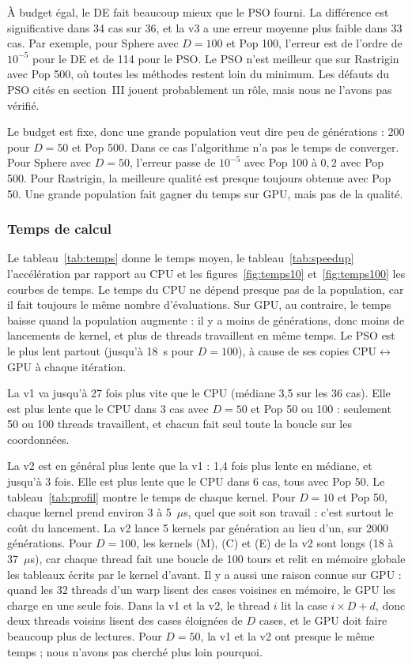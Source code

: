 \documentclass[conference]{IEEEtran}
\begin{document}
\`A budget \'egal, le DE fait beaucoup mieux que le PSO fourni. La diff\'erence est significative dans 34 cas sur 36, et la v3 a une erreur moyenne plus faible dans 33 cas. Par exemple, pour Sphere avec $D=100$ et Pop 100, l'erreur est de l'ordre de $10^{-5}$ pour le DE et de 114 pour le PSO. Le PSO n'est meilleur que sur Rastrigin avec Pop 500, o\`u toutes les m\'ethodes restent loin du minimum. Les d\'efauts du PSO cit\'es en section~III jouent probablement un r\^ole, mais nous ne l'avons pas v\'erifi\'e.

Le budget est fixe, donc une grande population veut dire peu de g\'en\'erations : 200 pour $D=50$ et Pop 500. Dans ce cas l'algorithme n'a pas le temps de converger. Pour Sphere avec $D=50$, l'erreur passe de $10^{-5}$ avec Pop 100 \`a $0{,}2$ avec Pop 500. Pour Rastrigin, la meilleure qualit\'e est presque toujours obtenue avec Pop 50. Une grande population fait gagner du temps sur GPU, mais pas de la qualit\'e.

\subsubsection{Temps de calcul}
Le tableau~\ref{tab:temps} donne le temps moyen, le tableau~\ref{tab:speedup} l'acc\'el\'eration par rapport au CPU et les figures~\ref{fig:temps10} et~\ref{fig:temps100} les courbes de temps. Le temps du CPU ne d\'epend presque pas de la population, car il fait toujours le m\^eme nombre d'\'evaluations. Sur GPU, au contraire, le temps baisse quand la population augmente : il y a moins de g\'en\'erations, donc moins de lancements de kernel, et plus de threads travaillent en m\^eme temps. Le PSO est le plus lent partout (jusqu'\`a 18~s pour $D=100$), \`a cause de ses copies CPU$\leftrightarrow$GPU \`a chaque it\'eration.

La v1 va jusqu'\`a 27 fois plus vite que le CPU (m\'ediane 3,5 sur les 36 cas). Elle est plus lente que le CPU dans 3 cas avec $D=50$ et Pop 50 ou 100 : seulement 50 ou 100 threads travaillent, et chacun fait seul toute la boucle sur les coordonn\'ees.

La v2 est en g\'en\'eral plus lente que la v1 : 1,4 fois plus lente en m\'ediane, et jusqu'\`a 3 fois. Elle est plus lente que le CPU dans 6 cas, tous avec Pop 50. Le tableau~\ref{tab:profil} montre le temps de chaque kernel. Pour $D=10$ et Pop 50, chaque kernel prend environ 3 \`a 5~$\mu$s, quel que soit son travail : c'est surtout le co\^ut du lancement. La v2 lance 5 kernels par g\'en\'eration au lieu d'un, sur 2000 g\'en\'erations. Pour $D=100$, les kernels (M), (C) et (E) de la v2 sont longs (18 \`a 37~$\mu$s), car chaque thread fait une boucle de 100 tours et relit en m\'emoire globale les tableaux \'ecrits par le kernel d'avant. Il y a aussi une raison connue sur GPU : quand les 32 threads d'un warp lisent des cases voisines en m\'emoire, le GPU les charge en une seule fois. Dans la v1 et la v2, le thread $i$ lit la case $i\times D+d$, donc deux threads voisins lisent des cases \'eloign\'ees de $D$ cases, et le GPU doit faire beaucoup plus de lectures. Pour $D=50$, la v1 et la v2 ont presque le m\^eme temps ; nous n'avons pas cherch\'e plus loin pourquoi.
\end{document}
